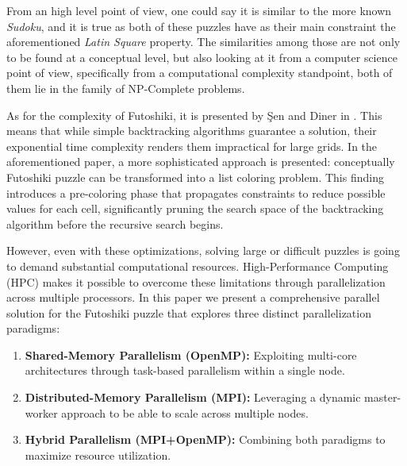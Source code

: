 From an high level point of view, one could say it is similar to the more known \textit{Sudoku}, and it is true as both of these puzzles have as their main constraint the aforementioned \textit{Latin Square} property. The similarities among those are not only to be found at a conceptual level, but also looking at it from a computer science point of view, specifically from a computational complexity standpoint, both of them lie in the family of NP-Complete problems. 

As for the complexity of Futoshiki, it is presented by Şen and Diner in \cite{Sen2024Futoshiki}. This means that while simple backtracking algorithms guarantee a solution, their exponential time complexity renders them impractical for large grids. In the aforementioned paper, a more sophisticated approach is presented: conceptually Futoshiki puzzle can be transformed into a list coloring problem. This finding introduces a pre-coloring phase that propagates constraints to reduce possible values for each cell, significantly pruning the search space of the backtracking algorithm before the recursive search begins.

However, even with these optimizations, solving large or difficult puzzles is going to demand substantial computational resources. High-Performance Computing (HPC) makes it possible to overcome these limitations through parallelization across multiple processors. In this paper we present a comprehensive parallel solution for the Futoshiki puzzle that explores three distinct parallelization paradigms:

\begin{enumerate}
    \item \textbf{Shared-Memory Parallelism (OpenMP):} \cite{OpenMP2020} Exploiting multi-core architectures through task-based parallelism within a single node.
    \item \textbf{Distributed-Memory Parallelism (MPI):} \cite{MPIForum2021} Leveraging a dynamic master-worker approach to be able to scale across multiple nodes.
    \item \textbf{Hybrid Parallelism (MPI+OpenMP):} Combining both paradigms to maximize resource utilization.
\end{enumerate}

